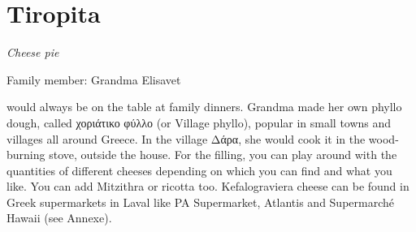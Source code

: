 \chapter{Tiropita}
\label{ch:tiropita}


\textit{Cheese pie}

Family member: Grandma Elisavet

 would always be on the table at family dinners. Grandma made her own phyllo dough, called \textgreek{χοριάτικο φύλλο} (or Village phyllo), popular in small towns and villages all around Greece. In the village \textgreek{Δάρα}, she would cook it in the wood-burning stove, outside the house. For the filling, you can play around with the quantities of different cheeses depending on which you can find and what you like. You can add Mitzithra or ricotta too. Kefalograviera cheese can be found in Greek supermarkets in Laval like PA Supermarket, Atlantis and Supermarché Hawaii (see Annexe).


